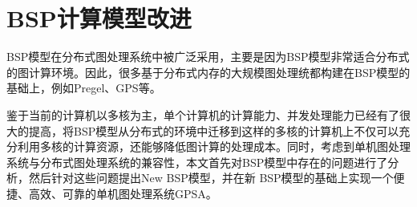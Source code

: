 \section{BSP计算模型改进}

BSP模型在分布式图处理系统中被广泛采用，主要是因为BSP模型非常适合分布式的图计算环境。因此，很多基于分布式内存的大规模图处理统都构建在BSP模型的基础上，例如Pregel、GPS等。

鉴于当前的计算机以多核为主，单个计算机的计算能力、并发处理能力已经有了很大的提高，将BSP模型从分布式的环境中迁移到这样的多核的计算机上不仅可以充分利用多核的计算资源，还能够降低图计算的处理成本。同时，考虑到单机图处理系统与分布式图处理系统的兼容性，本文首先对BSP模型中存在的问题进行了分析，然后针对这些问题提出New BSP模型，并在新 BSP模型的基础上实现一个便捷、高效、可靠的单机图处理系统GPSA。


